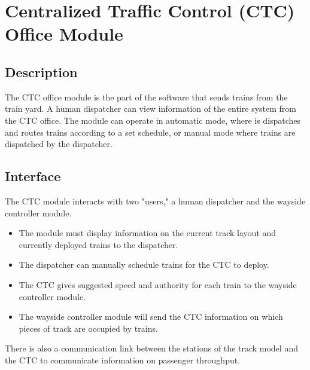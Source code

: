 \documentclass{scrreprt}
\begin{document}
\section{Centralized Traffic Control (CTC) Office Module}

\subsection{Description}
The CTC office module is the part of the software that sends trains from the 
train yard. A human dispatcher can view information of the entire system 
from the CTC office. The module can operate in automatic mode, where is dispatches 
and routes trains according to a set schedule, or manual mode where trains are 
dispatched by the dispatcher.

\subsection{Interface}
The CTC module interacts with two "users," a human dispatcher and the wayside controller 
module. 
\begin{itemize}
  \item The module must display information on the current track layout and currently 
  deployed trains to the dispatcher. 
  \item The dispatcher can manually schedule trains for the CTC to deploy. 
\end{itemize}
\begin{itemize}
  \item The CTC gives suggested speed and authority for each train to the wayside 
  controller module. 
  \item The wayside controller module will send the CTC information on which pieces of 
  track are occupied by trains. 
\end{itemize}
There is also a communication link between the stations of the track model and the 
CTC to communicate information on passenger throughput.
\end{document}
